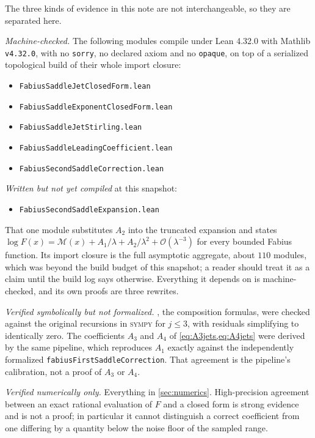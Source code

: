 \documentclass[11pt,oneside]{article}
\theoremstyle{definition}
\theoremstyle{remark}
\newcommand{\bigO}{\mathcal O}
\begin{document}
The three kinds of evidence in this note are not interchangeable, so they
are separated here.

\emph{Machine-checked.}  The following modules compile under Lean 4.32.0
with Mathlib \texttt{v4.32.0}, with no \texttt{sorry}, no declared axiom and
no \texttt{opaque}, on top of a serialized topological build of their whole
import closure:
\begin{itemize}
\item \texttt{FabiusSaddleJetClosedForm.lean}
\item \texttt{FabiusSaddleExponentClosedForm.lean}
\item \texttt{FabiusSaddleJetStirling.lean}
\item \texttt{FabiusSaddleLeadingCoefficient.lean}
\item \texttt{FabiusSecondSaddleCorrection.lean}
\end{itemize}

\emph{Written but not yet compiled} at this snapshot:
\begin{itemize}
\item \texttt{FabiusSecondSaddleExpansion.lean}
\end{itemize}
That one module substitutes $A_2$ into the truncated expansion and states
$\log F(x)=\mathcal M(x)+A_1/\lambda+A_2/\lambda^2+\bigO(\lambda^{-3})$ for
every bounded Fabius function.  Its import closure is the full asymptotic
aggregate, about $110$ modules, which was beyond the build budget of this
snapshot; a reader should treat it as a claim until the build log says
otherwise.  Everything it depends on is machine-checked, and its own proofs
are three rewrites.

\emph{Verified symbolically but not formalized.}  ,
the composition formulas, were checked against the original recursions in
\textsc{sympy} for $j\le3$, with residuals simplifying to identically zero.
The coefficients $A_3$ and $A_4$ of \cref{eq:A3jets,eq:A4jets} were derived
by the same pipeline, which reproduces $A_1$ exactly against the
independently formalized \texttt{fabiusFirstSaddleCorrection}.  That
agreement is the pipeline's calibration, not a proof of $A_3$ or $A_4$.

\emph{Verified numerically only.}  Everything in \cref{sec:numerics}.
High-precision agreement between an exact rational evaluation of $F$ and a
closed form is strong evidence and is not a proof; in particular it cannot
distinguish a correct coefficient from one differing by a quantity below the
noise floor of the sampled range.
\end{document}
